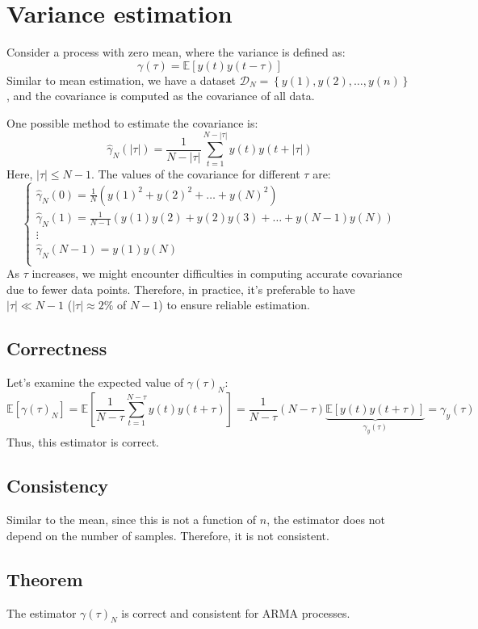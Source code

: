 \section{Variance estimation}

Consider a process with zero mean, where the variance is defined as:
\[\gamma(\tau)=\mathbb{E}\left[y(t)y(t-\tau)\right]\]
Similar to mean estimation, we have a dataset $\mathcal{D}_N=\left\{ y(1),y(2),\dots,y(n) \right\}$, and the covariance is computed as the covariance of all data.

One possible method to estimate the covariance is:
\[\hat{\gamma}_N(\left\lvert \tau\right\rvert )=\dfrac{1}{N-\left\lvert \tau\right\rvert}\sum_{t=1}^{N-\left\lvert \tau\right\rvert}y(t)y(t+\left\lvert \tau\right\rvert)\]
Here, $\left\lvert \tau\right\rvert \leq N-1$. 
The values of the covariance for different $\tau$ are:
\[\begin{cases}
    \hat{\gamma}_N(0)=\frac{1}{N}\left(y(1)^2+y(2)^2+\dots+y(N)^2\right) \\
    \hat{\gamma}_N(1)=\frac{1}{N-1}\left(y(1)y(2)+y(2)y(3)+\dots+y(N-1)y(N)\right) \\
    \vdots \\
    \hat{\gamma}_N(N-1)=y(1)y(N) \\
\end{cases}\]
As $\tau$ increases, we might encounter difficulties in computing accurate covariance due to fewer data points.
Therefore, in practice, it's preferable to have $|\tau|\ll N-1$ ($|\tau|\approx 2\%$ of $N-1$) to ensure reliable estimation. 

\subsection{Correctness}
Let's examine the expected value of $\gamma(\tau)_N$: 
\[\mathbb{E}\left[ \gamma(\tau)_N\right] =\mathbb{E}\left[ \dfrac{1}{N-\tau}\sum_{t=1}^{N- \tau}y(t)y(t+ \tau)\right]=\dfrac{1}{N-\tau}\left( N-\tau \right)\underbrace{\mathbb{E}\left[y(t)y(t+ \tau)\right]}_{\gamma_y(\tau)}=\gamma_y(\tau)\]
Thus, this estimator is correct.

\subsection{Consistency}
Similar to the mean, since this is not a function of $n$, the estimator does not depend on the number of samples. 
Therefore, it is not consistent.

\subsection{Theorem}
\begin{theorem}
    The estimator $\gamma(\tau)_N$ is correct and consistent for ARMA processes. 
\end{theorem}